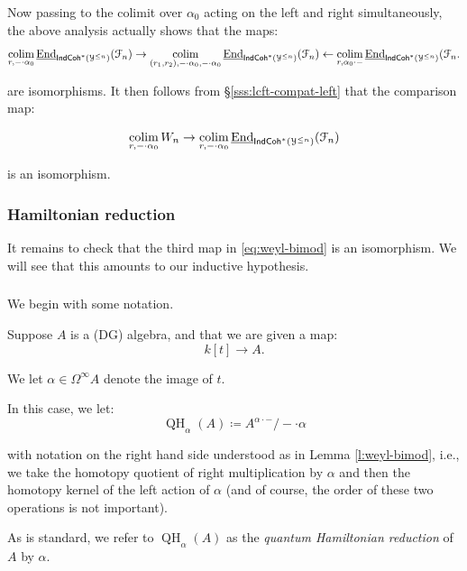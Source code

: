 \documentclass[reqno,11pt]{amsart}
\numberwithin{equation}{subsection}
\theoremstyle{remark}
\newcommand{\sF}{{\EuScript F}}
\newcommand{\sY}{{\EuScript Y}}
\newcommand{\on}{\operatorname}
\newcommand{\ul}{\underline}
\newcommand{\End}{\on{End}}
\newcommand{\colim}{\on{colim}}
\newcommand{\IndCoh}{\mathsf{IndCoh}}
\begin{document}
Now passing to the colimit over $\alpha_0$ acting on the left and
right simultaneously, the above analysis actually shows that the maps: 
%
\[
\underset{r,-\cdot \alpha_0}{\colim} \, \ul{\End}_{\IndCoh^*(\sY^{\leq n})}(\sF_n)
\to \underset{(r_1,r_2),-\cdot \alpha_0,-\cdot \alpha_0}{\colim} \, \ul{\End}_{\IndCoh^*(\sY^{\leq n})}(\sF_n)
\leftarrow 
\underset{r,\alpha_0 \cdot -}{\colim} \, \ul{\End}_{\IndCoh^*(\sY^{\leq n})}(\sF_n.
\]

\noindent are isomorphisms. It then follows from \S \ref{sss:lcft-compat-left} that
the comparison map:

\[
\underset{r,-\cdot \alpha_0}{\colim} \, W_n \to 
\underset{r,-\cdot \alpha_0}{\colim} \, \ul{\End}_{\IndCoh^*(\sY^{\leq n})}(\sF_n)
\]

\noindent is an isomorphism. 

\subsubsection{Hamiltonian reduction}

It remains to check that the third map in \eqref{eq:weyl-bimod} 
is an isomorphism. We will see that this amounts to our
inductive hypothesis.

\subsubsection{}\label{sss:qh-1}

We begin with some notation.

Suppose $A$ is a (DG) algebra, and that we are given a map:
%
\[
k[t] \to A.
\] 

\noindent We let $\alpha \in \Omega^{\infty} A$ denote the image of $t$.

In this case, we let:
%
\[
\on{QH}_{\alpha}(A) \coloneqq A^{\alpha\cdot-}/-\cdot \alpha 
\]

\noindent with notation on the right hand side understood as
in Lemma \ref{l:weyl-bimod}, i.e., we take the homotopy quotient of 
right multiplication by $\alpha$ and then the homotopy kernel of the
left action of $\alpha$ (and of course, the order of these two operations is
not important).

As is standard, we refer to $\on{QH}_{\alpha}(A)$ 
as the \emph{quantum Hamiltonian reduction} 
of $A$ by $\alpha$.

\subsubsection{}
\end{document}
